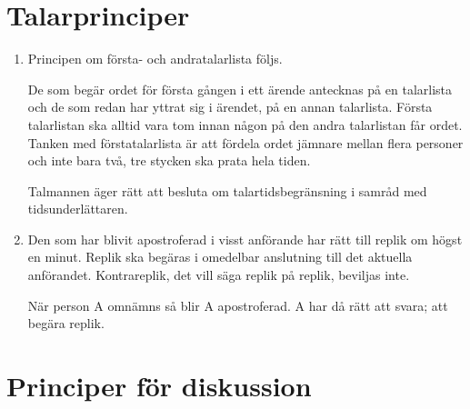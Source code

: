 \documentclass{dvd}
\begin{document}
	\section{Talarprinciper}

	\begin{enumerate}[label=\arabic* §, ref=\arabic*]
		\item Principen om första- och andratalarlista följs.

		De som begär ordet för första gången i ett ärende antecknas på en talarlista och de som redan har yttrat sig i ärendet, på en annan talarlista.
		Första talarlistan ska alltid vara tom innan någon på den andra talarlistan får ordet.
		Tanken med förstatalarlista är att fördela ordet jämnare mellan flera personer och inte bara två, tre stycken ska prata hela tiden.

		Talmannen äger rätt att besluta om talartidsbegränsning i samråd med tidsunderlättaren.

		\item Den som har blivit apostroferad i visst anförande har rätt till replik om högst en minut.
		Replik ska begäras i omedelbar anslutning till det aktuella anförandet.
		Kontrareplik, det vill säga replik på replik, beviljas inte.

		När person A omnämns så blir A apostroferad. A har då rätt att svara; att begära replik.
	\end{enumerate}

	\section{Principer för diskussion}
\end{document}
